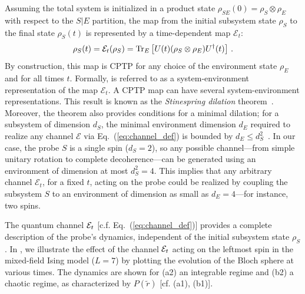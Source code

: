 \documentclass[letterpaper,superscriptaddress,aps,pra,nolongbibliography,showpacs,floatfix,dvipsnames,10pt,twocolumn]{revtex4-2}
\begin{document}
Assuming the total system is initialized in a product state
$\rho_{SE}(0) = \rho_S \otimes \rho_E$ with respect to the
$S|E$ partition, the map from the initial subsystem state $\rho_S$
to the final state $\rho_S(t)$ is represented by a time-dependent
map $\mathcal{E}_t$:
\begin{equation}\label{eq:channel_def}
\rho_S(t) = \mathcal{E}_t(\rho_S)
= \Tr_E\left[ U(t) (\rho_S \otimes \rho_E) U^\dagger(t) \right] \, .
\end{equation}
By construction, this map is CPTP
for any choice of the environment state $\rho_E$ and for all
times $t$. Formally,  is referred to as a
system-environment representation of the map $\mathcal{E}_t$. A CPTP map
can have several system-environment representations. This result is
known as the \textit{Stinespring dilation}
theorem~\cite{stinespring_1955_positive}. Moreover,
the theorem also provides conditions for a minimal dilation; for a
subsystem of dimension $d_S$, the minimal environment dimension $d_E$
required to realize any channel $\mathcal{E}$ via Eq.~(\ref{eq:channel_def})
is bounded by $d_E \le d_S^2$~\cite{watrous_2018_theory}. 
In our case, the probe $S$ is a single
spin ($d_S=2$), so any possible channel—from simple unitary rotation
to complete decoherence—can be generated using an environment  of
dimension at most $d_S^2 = 4$. This implies that any arbitrary channel
$\mathcal{E}_t$, for a fixed $t$, acting on the probe could be realized by
coupling the subsystem $S$ to an environment of dimension as small as
$d_E = 4$---for instance, two spins.

The quantum channel $\mathcal{E}_t$ [c.f. Eq.~(\ref{eq:channel_def})] provides a complete
description of the probe's dynamics, independent of the initial
subsystem state $\rho_S$. 
In , we illustrate the effect of the
channel $\mathcal{E}_t$ acting on the leftmost spin in the mixed-field Ising model ($L=7$)
by plotting the evolution of the Bloch sphere at various times.
The dynamics are shown for (a2) an integrable regime and (b2) a
chaotic regime, as characterized by $P(\tilde{r})$ [cf. (a1), (b1)].
\end{document}
